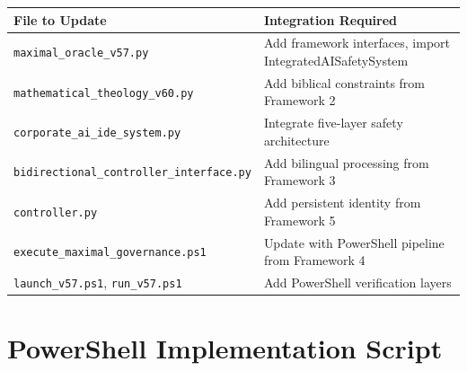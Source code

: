 \documentclass[12pt]{article}
\begin{document}
\begin{longtable}{|p{}|p{}|}
\hline
\textbf{File to Update} & \textbf{Integration Required} \\
\hline
\texttt{maximal\_oracle\_v57.py} & Add framework interfaces, import IntegratedAISafetySystem \\
\hline
\texttt{mathematical\_theology\_v60.py} & Add biblical constraints from Framework 2 \\
\hline
\texttt{corporate\_ai\_ide\_system.py} & Integrate five-layer safety architecture \\
\hline
\texttt{bidirectional\_controller\_interface.py} & Add bilingual processing from Framework 3 \\
\hline
\texttt{controller.py} & Add persistent identity from Framework 5 \\
\hline
\texttt{execute\_maximal\_governance.ps1} & Update with PowerShell pipeline from Framework 4 \\
\hline
\texttt{launch\_v57.ps1}, \texttt{run\_v57.ps1} & Add PowerShell verification layers \\
\hline
\end{longtable}

\section{PowerShell Implementation Script}
\end{document}
